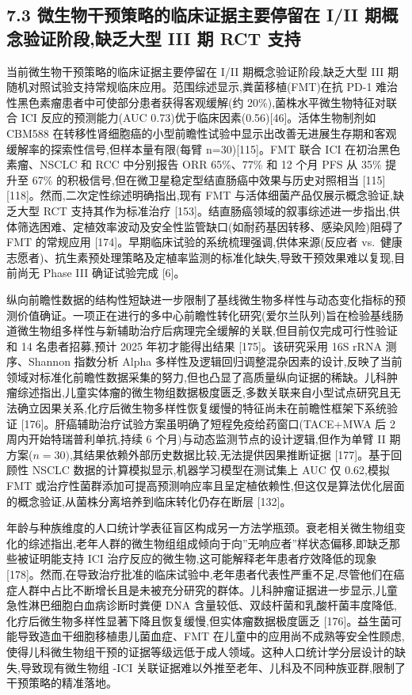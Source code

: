 \subsection{7.3 微生物干预策略的临床证据主要停留在 I/II 期概念验证阶段,缺乏大型 III 期 RCT 支持}\label{ux5faeux751fux7269ux5e72ux9884ux7b56ux7565ux7684ux4e34ux5e8aux8bc1ux636eux4e3bux8981ux505cux7559ux5728-iii-ux671fux6982ux5ff5ux9a8cux8bc1ux9636ux6bb5ux7f3aux4e4fux5927ux578b-iii-ux671f-rct-ux652fux6301}

当前微生物干预策略的临床证据主要停留在 I/II 期概念验证阶段,缺乏大型 III 期随机对照试验支持常规临床应用。范围综述显示,粪菌移植(FMT)在抗 PD-1 难治性黑色素瘤患者中可使部分患者获得客观缓解(约 20\%),菌株水平微生物特征对联合 ICI 反应的预测能力(AUC 0.73)优于临床因素(0.56){[}46{]}。活体生物制剂如 CBM588 在转移性肾细胞癌的小型前瞻性试验中显示出改善无进展生存期和客观缓解率的探索性信号,但样本量有限(每臂 n=30){[}115{]}。FMT 联合 ICI 在初治黑色素瘤、NSCLC 和 RCC 中分别报告 ORR 65\%、77\% 和 12 个月 PFS 从 35\% 提升至 67\% 的积极信号,但在微卫星稳定型结直肠癌中效果与历史对照相当 {[}115{]}{[}118{]}。然而,二次定性综述明确指出,现有 FMT 与活体细菌产品仅展示概念验证,缺乏大型 RCT 支持其作为标准治疗 {[}153{]}。结直肠癌领域的叙事综述进一步指出,供体筛选困难、定植效率波动及安全性监管缺口(如耐药基因转移、感染风险)阻碍了 FMT 的常规应用 {[}174{]}。早期临床试验的系统梳理强调,供体来源(反应者 vs.~健康志愿者)、抗生素预处理策略及定植率监测的标准化缺失,导致干预效果难以复现,目前尚无 Phase III 确证试验完成 {[}6{]}。

纵向前瞻性数据的结构性短缺进一步限制了基线微生物多样性与动态变化指标的预测价值确证。一项正在进行的多中心前瞻性转化研究(爱尔兰队列)旨在检验基线肠道微生物组多样性与新辅助治疗后病理完全缓解的关联,但目前仅完成可行性验证和 14 名患者招募,预计 2025 年初才能得出结果 {[}175{]}。该研究采用 16S rRNA 测序、Shannon 指数分析 Alpha 多样性及逻辑回归调整混杂因素的设计,反映了当前领域对标准化前瞻性数据采集的努力,但也凸显了高质量纵向证据的稀缺。儿科肿瘤综述指出,儿童实体瘤的微生物组数据极度匮乏,多数关联来自小型试点研究且无法确立因果关系,化疗后微生物多样性恢复缓慢的特征尚未在前瞻性框架下系统验证 {[}176{]}。肝癌辅助治疗试验方案虽明确了短程免疫给药窗口(TACE+MWA 后 2 周内开始特瑞普利单抗,持续 6 个月)与动态监测节点的设计逻辑,但作为单臂 II 期方案(\(n=30)\),其结果依赖外部历史数据比较,无法提供因果推断证据 {[}177{]}。基于回顾性 NSCLC 数据的计算模拟显示,机器学习模型在测试集上 AUC 仅 0.62,模拟 FMT 或治疗性菌群添加可提高预测响应率且呈定植依赖性,但这仅是算法优化层面的概念验证,从菌株分离培养到临床转化仍存在断层 {[}132{]}。

年龄与种族维度的人口统计学表征盲区构成另一方法学瓶颈。衰老相关微生物组变化的综述指出,老年人群的微生物组组成倾向于向''无响应者''样状态偏移,即缺乏那些被证明能支持 ICI 治疗反应的微生物,这可能解释老年患者疗效降低的现象 {[}178{]}。然而,在导致治疗批准的临床试验中,老年患者代表性严重不足,尽管他们在癌症人群中占比不断增长且是未被充分研究的群体。儿科肿瘤证据进一步显示,儿童急性淋巴细胞白血病诊断时粪便 DNA 含量较低、双歧杆菌和乳酸杆菌丰度降低,化疗后微生物多样性显著下降且恢复缓慢,但实体瘤数据极度匮乏 {[}176{]}。益生菌可能导致造血干细胞移植患儿菌血症、FMT 在儿童中的应用尚不成熟等安全性顾虑,使得儿科微生物组干预的证据等级远低于成人领域。这种人口统计学分层设计的缺失,导致现有微生物组 -ICI 关联证据难以外推至老年、儿科及不同种族亚群,限制了干预策略的精准落地。

